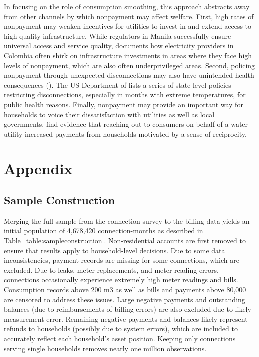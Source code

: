 \documentclass[12pt]{article}
\begin{document}
In focusing on the role of consumption smoothing, this approach abstracts away from other channels by which nonpayment may affect welfare.  First, high rates of nonpayment may weaken incentives for utilities to invest in and extend access to high quality infrastructure.  While regulators in Manila successfully ensure universal access and service quality, \cite{mcrae2015infrastructure} documents how electricity providers in Colombia often shirk on infrastructure investments in areas where they face high levels of nonpayment, which are also often underprivileged areas.  Second, policing nonpayment through unexpected disconnections may also have unintended health consequences (\cite{franklin2017}).  The US Department of \cite{liheap} lists a series of state-level policies restricting disconnections, especially in months with extreme temperatures, for public health reasons.  Finally, nonpayment may provide an important way for households to voice their dissatisfaction with utilities as well as local governments.  \cite{szabo2015reducing} find evidence that reaching out to consumers on behalf of a water utility increased payments from households motivated by a sense of reciprocity. 

\pagebreak

\section{Appendix}

\subsection{Sample Construction}\label{appendix:sampleconstruction}

Merging the full sample from the connection survey to the billing data yields an initial population of 4,678,420 connection-months as described in Table~\ref{table:sampleconstruction}.  Non-residential accounts are first removed to ensure that results apply to household-level decisions.  Due to some data inconsistencies, payment records are missing for some connections, which are excluded.  Due to leaks, meter replacements, and meter reading errors, connections occasionally experience extremely high meter readings and bills.  Consumption records above 200 m3 as well as bills and payments above 80,000 are censored to address these issues.  Large negative payments and outstanding balances (due to reimbursements of billing errors) are also excluded due to likely measurement error.  Remaining negative payments and balances likely represent refunds to households (possibly due to system errors), which are included to accurately reflect each household's asset position.  Keeping only connections serving single households removes nearly one million observations.
\end{document}
